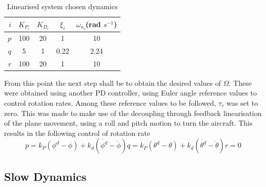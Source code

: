 \begin{table}[htbp]
  \centering
  \caption[Linearised system chosen dynamics]{Linearised system chosen dynamics}
    \begin{tabular}{rcccc}
    \toprule
    $i$   & $K_{P_i}$ & $K_{D_i}$ & $\xi_i$ & $\omega_{n_i}$(rad $s^{-1}$) \\
    \midrule
    $p$   & 100   & 20    & 1     & 10 \\
    $q$   & 5     & 1     & 0.22 & 2.24 \\
    $r$   & 100   & 20    & 1     & 10 \\
    \bottomrule
    \end{tabular}%
  \label{tab:tau_dynamics}%
\end{table}%


From this point the next step shall be to obtain the desired values of $\Omega$. These were obtained using another PD controller, using Euler angle reference values to control rotation rates. Among these reference values to be followed, $\tau_r$ was set to zero. This was made to make use of the decoupling through feedback linearisation of the plane movement, using a roll and pitch motion to turn the aircraft. This results in the following control of rotation rate
\begin{subequations}
\begin{equation}
p= k_P (\phi^d-\phi) + k_d (\dot{\phi^d}-\dot{\phi})
\end{equation}
\begin{equation}
q= k_P (\theta^d-\theta) + k_d (\dot{\theta^d}-\dot{\theta})
\end{equation}
\begin{equation}
r=0
\end{equation}
\end{subequations}

\subsection{Slow Dynamics}

